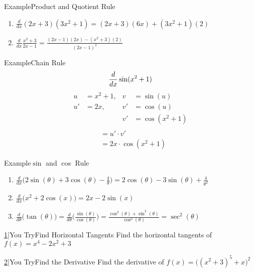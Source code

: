 \documentclass{MathNotes}
\newenvironment{example}[1]{\begin{BlueBox}{Example}{#1}}{\end{BlueBox}}
\newenvironment{practice}[2]{\begin{PurpleBox}{\texorpdfstring{#1}\Big|You Try}{#2}}{\end{PurpleBox}}
\begin{document}
\begin{example}{Product and Quotient Rule}\label{ex:product-quotient-rule}
	\begin{enumerate}
		\item $\displaystyle\frac{d}{dx}(2x+3)(3x^2+1)=(2x+3)(6x)+(3x^2+1)(2)$
		\item $\displaystyle\frac{d}{dx}\frac{x^2+3}{2x-1}
			      =\frac{(2x-1)(2x)-(x^2+3)(2)}{(2x-1)^2}$
	\end{enumerate}
\end{example}

\newpage
{}
\begin{example}{Chain Rule}\label{ex:chain-rule}
	$$
		\frac{d}{dx}\sin(x^2+1) \\
	$$
	\begin{align*}
		u  & =x^2+1, & v  & =\sin(u)     \\
		u' & =2x,    & v' & =\cos(u)     \\
		   &         & v' & =\cos(x^2+1) \\
	\end{align*}
	\begin{align*}
		 & =u'\cdot v'         \\
		 & =2x\cdot\cos(x^2+1)
	\end{align*}
\end{example}
\begin{example}{$\sin$ and $\cos$ Rule}\label{ex:sin-cos-rule}
	\begin{enumerate}
		\item $\displaystyle\frac{d}{dx}
			      \bigl(2\sin(\theta)+3\cos(\theta)-\frac{4}{\theta}\bigr)=
			      2\cos(\theta)-3\sin(\theta)+\frac{4}{\theta^2}
		      $
		\item $\displaystyle\frac{d}{dx}\bigl(x^2+2\cos(x)\bigr)=2x-2\sin(x)$
		\item $\displaystyle\frac{d}{d\theta}\bigl(\tan(\theta)\bigr)
			      =\frac{d}{d\theta}\bigl(\frac{\sin(\theta)}{\cos(\theta)}\bigr)
			      =\frac{\cos^2(\theta)+\sin^2(\theta)}{\cos^2(\theta)}
			      =\sec^2(\theta)$
	\end{enumerate}
\end{example}

\begin{multicols}{2}
	\begin{practice}{\hyperref[ans:horizontal-tangents]{1}}{Find Horizontal Tangents}
		\label{prac:horizontal-tangents}
		Find the horizontal tangents of $f(x)=x^4-2x^2+3$
	\end{practice}
	\begin{practice}{\hyperref[ans:find-derivative]{2}}{Find the Derivative}\label{prac:find-derivative}
		Find the derivative of \newline$\displaystyle f(x)=\big((x^2+3)^5+x\big)^2$
	\end{practice}
\end{multicols}
\end{document}
